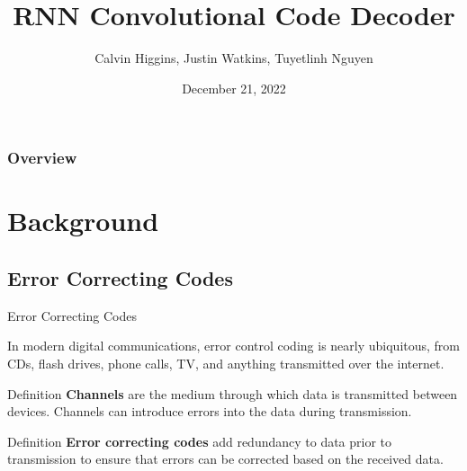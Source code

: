 \documentclass{beamer}
\title[RNN Decoder]{RNN Convolutional Code Decoder} %
\author[C. Higgins, J. Watkins, T. Nguyen]{Calvin Higgins, Justin Watkins, Tuyetlinh Nguyen} %
\institute[URI] %
{
University of Rhode Island %
}
\date{December 21, 2022} %
\newcommand{\<}				{\langle}
\renewcommand{\>}      		{\rangle}
\begin{document}

\begin{frame}
\titlepage %
\end{frame}


\begin{frame}
\frametitle{Overview} 
\tableofcontents 
\end{frame}


\section{Background} 

\subsection{Error Correcting Codes} 

\begin{frame}{Error Correcting Codes}

In modern digital communications, error control coding is nearly ubiquitous, from CDs, flash drives, phone calls, TV, and anything transmitted over the internet.

\medskip

\begin{block}{Definition}
\textbf{Channels} are the medium through which data is transmitted between devices. Channels can introduce errors into the data during transmission.

\end{block}

\medskip

\begin{block}{Definition}
\textbf{Error correcting codes} add redundancy to data prior to transmission to ensure that errors can be corrected based on the received data. 

\end{block}

\end{frame}
\end{document}
